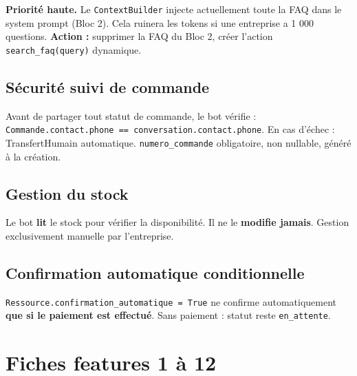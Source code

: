 \documentclass[11pt,a4paper]{article}
\newcommand{\slug}[1]{\texttt{\color{AGTDark}#1}}
\begin{document}
\begin{warnbox}
\textbf{Priorité haute.} Le \slug{ContextBuilder} injecte actuellement toute la FAQ
dans le system prompt (Bloc 2). Cela ruinera les tokens si une entreprise a 1 000
questions. \textbf{Action :} supprimer la FAQ du Bloc 2, créer l'action
\slug{search\_faq(query)} dynamique.
\end{warnbox}

\subsection{Sécurité suivi de commande}

Avant de partager tout statut de commande, le bot vérifie :
\texttt{Commande.contact.phone == conversation.contact.phone}.
En cas d'échec : TransfertHumain automatique.
\slug{numero\_commande} obligatoire, non nullable, généré à la création.

\subsection{Gestion du stock}

Le bot \textbf{lit} le stock pour vérifier la disponibilité.
Il ne le \textbf{modifie jamais}. Gestion exclusivement manuelle par l'entreprise.

\subsection{Confirmation automatique conditionnelle}

\slug{Ressource.confirmation\_automatique = True} ne confirme automatiquement
\textbf{que si le paiement est effectué}. Sans paiement : statut reste \texttt{en\_attente}.

\section{Fiches features 1 à 12}
\end{document}
